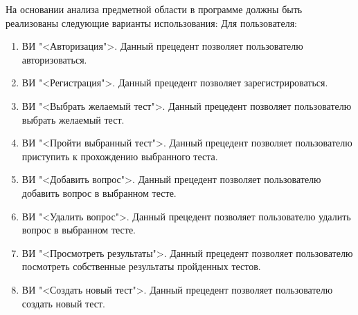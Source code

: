 На основании анализа предметной области в программе должны быть реализованы следующие варианты использования: 
Для пользователя:
\begin{enumerate}
\item ВИ "<Авторизация">. Данный прецедент позволяет пользователю авторизоваться.
\item ВИ "<Регистрация">. Данный прецедент позволяет зарегистрироваться.
\item ВИ "<Выбрать желаемый тест">. Данный прецедент позволяет пользователю выбрать желаемый тест.
\item ВИ "<Пройти выбранный тест">. Данный прецедент позволяет пользователю приступить к прохождению выбранного теста.
\item ВИ "<Добавить вопрос">. Данный прецедент позволяет пользователю добавить вопрос в выбранном тесте.
\item ВИ "<Удалить вопрос">. Данный прецедент позволяет пользователю удалить вопрос в выбранном тесте.
\item ВИ "<Просмотреть результаты">. Данный прецедент позволяет пользователю посмотреть собственные результаты пройденных тестов.
\item ВИ "<Создать новый тест">. Данный прецедент позволяет пользователю создать новый тест.
\end{enumerate}

